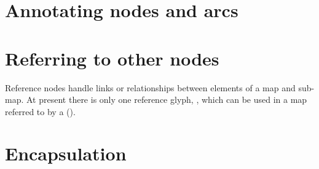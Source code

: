 \section{Annotating nodes and arcs}



\section{Referring to other nodes}
\label{sec:ref_nodes}

Reference nodes handle links or relationships between elements of a map and sub-map.
At present there is only one reference glyph, , which can be used in a map referred to by a  ().




\section{Encapsulation}
\label{sec:encapsulation}



